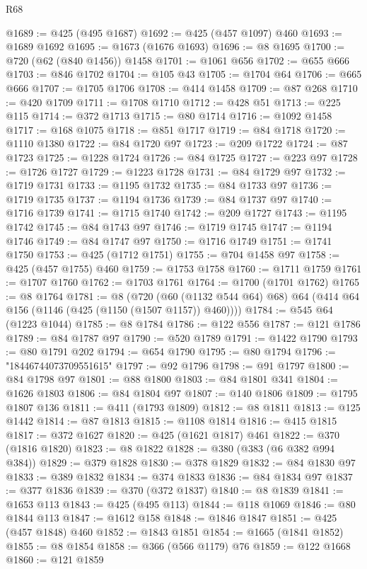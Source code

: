\begin{lexlean}{R68}
\begin{coremodule}
@1689 := @425 (@495 @1687)
@1692 := @425 (@457 @1097) @460
@1693 := @1689 @1692
@1695 := @1673 (@1676 @1693)
@1696 := @8 @1695
@1700 := @720 (@62 (@840 @1456)) @1458
@1701 := @1061 @656
@1702 := @655 @666
@1703 := @846 @1702
@1704 := @105 @43
@1705 := @1704 @64
@1706 := @665 @666
@1707 := @1705 @1706
@1708 := @414 @1458
@1709 := @87 @268
@1710 := @420 @1709
@1711 := @1708 @1710
@1712 := @428 @51
@1713 := @225 @115
@1714 := @372 @1713
@1715 := @80 @1714
@1716 := @1092 @1458
@1717 := @168 @1075
@1718 := @851 @1717
@1719 := @84 @1718
@1720 := @1110 @1380
@1722 := @84 @1720 @97
@1723 := @209 @1722
@1724 := @87 @1723
@1725 := @1228 @1724
@1726 := @84 @1725
@1727 := @223 @97
@1728 := @1726 @1727
@1729 := @1223 @1728
@1731 := @84 @1729 @97
@1732 := @1719 @1731
@1733 := @1195 @1732
@1735 := @84 @1733 @97
@1736 := @1719 @1735
@1737 := @1194 @1736
@1739 := @84 @1737 @97
@1740 := @1716 @1739
@1741 := @1715 @1740
@1742 := @209 @1727
@1743 := @1195 @1742
@1745 := @84 @1743 @97
@1746 := @1719 @1745
@1747 := @1194 @1746
@1749 := @84 @1747 @97
@1750 := @1716 @1749
@1751 := @1741 @1750
@1753 := @425 (@1712 @1751)
@1755 := @704 @1458 @97
@1758 := @425 (@457 @1755) @460
@1759 := @1753 @1758
@1760 := @1711 @1759
@1761 := @1707 @1760
@1762 := @1703 @1761
@1764 := @1700 (@1701 @1762)
@1765 := @8 @1764
@1781 := @8
    (@720 (@60 (@1132 @544 @64) @68) @64 (@414 @64 @156 (@1146 (@425 (@1150 (@1507 @1157)) @460))))
@1784 := @545 @64 (@1223 @1044)
@1785 := @8 @1784
@1786 := @122 @556
@1787 := @121 @1786
@1789 := @84 @1787 @97
@1790 := @520 @1789
@1791 := @1422 @1790
@1793 := @80 @1791 @202
@1794 := @654 @1790
@1795 := @80 @1794
@1796 := "18446744073709551615"
@1797 := @92 @1796
@1798 := @91 @1797
@1800 := @84 @1798 @97
@1801 := @88 @1800
@1803 := @84 @1801 @341
@1804 := @1626 @1803
@1806 := @84 @1804 @97
@1807 := @140 @1806
@1809 := @1795 @1807 @136
@1811 := @411 (@1793 @1809)
@1812 := @8 @1811
@1813 := @125 @1442
@1814 := @87 @1813
@1815 := @1108 @1814
@1816 := @415 @1815
@1817 := @372 @1627
@1820 := @425 (@1621 @1817) @461
@1822 := @370 (@1816 @1820)
@1823 := @8 @1822
@1828 := @380 (@383 (@6 @382 @994 @384))
@1829 := @379 @1828
@1830 := @378 @1829
@1832 := @84 @1830 @97
@1833 := @389 @1832
@1834 := @374 @1833
@1836 := @84 @1834 @97
@1837 := @377 @1836
@1839 := @370 (@372 @1837)
@1840 := @8 @1839
@1841 := @1653 @113
@1843 := @425 (@495 @113)
@1844 := @118 @1069
@1846 := @80 @1844 @113
@1847 := @1612 @158
@1848 := @1846 @1847
@1851 := @425 (@457 @1848) @460
@1852 := @1843 @1851
@1854 := @1665 (@1841 @1852)
@1855 := @8 @1854
@1858 := @366 (@566 @1179) @76
@1859 := @122 @1668
@1860 := @121 @1859

\end{coremodule}
\end{lexlean}
